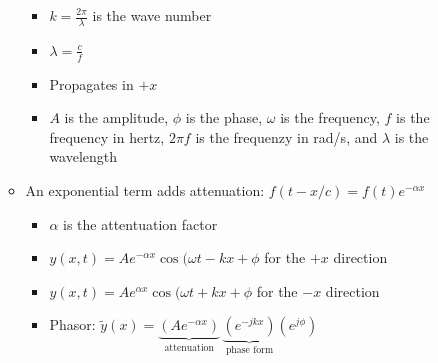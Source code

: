 \begin{itemize}
\begin{itemize}
        \begin{itemize}

          \item $k=\frac{2\pi}{\lambda}$ is the wave number

          \item $\lambda=\frac{c}{f}$

          \item Propagates in $+x$

          \item $A$ is the amplitude, $\phi$ is the phase, $\omega$ is the frequency, $f$ is the frequency in hertz, $2\pi f$ is the frequenzy in rad/s, and $\lambda$ is the wavelength

        \end{itemize}

      \item An exponential term adds attenuation: $f(t-x/c)=f(t)e^{-\alpha x}$

        \begin{itemize}
            
          \item $\alpha$ is the attentuation factor

          \item $y(x,t)=Ae^{-\alpha x}\cos(\omega t -kx+\phi$ for the $+x$ direction

          \item $y(x,t)=Ae^{\alpha x}\cos(\omega t +kx+\phi$ for the $-x$ direction

          \item Phasor: $\tilde{y}(x)=\underbrace{\left(Ae^{-\alpha x}\right)}_{\text{attenuation}}\,\underbrace{\left(e^{-jkx}\right)}_{\text{phase form}}\left(e^{j\phi}\right)$

        \end{itemize}

    \end{itemize}

\end{itemize}



